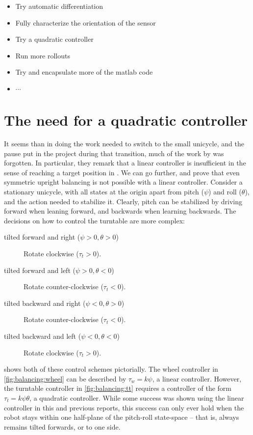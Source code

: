 \documentclass[main.tex]{subfiles}
\begin{document}
	\begin{itemize}
		\item Try automatic differentiation
		\item Fully characterize the orientation of the sensor
		\item Try a quadratic controller
		\item Run more rollouts
		\item Try and encapsulate more of the matlab code
		\item $\cdots$
	\end{itemize}

	\section{The need for a quadratic controller}

	It seems than in doing the work needed to switch to the small unicycle, and the pause put in the project during that transition, much of the work by \citeauthor{queiro} was forgotten.
	In particular, they remark that a linear controller is insufficient in the sense of reaching a target position in \cite[fig.~8]{queiro}.
	We can go further, and prove that even symmetric upright balancing is not possible with a linear controller.
	Consider a stationary unicycle, with all states at the origin apart from pitch ($\psi$) and roll ($\theta$), and the action needed to stabilize it.
	Clearly, pitch can be stabilized by driving forward when leaning forward, and backwards when learning backwards.
	The decisions on how to control the turntable are more complex:
	\begin{description}
		\item[tilted forward and right ($\psi > 0, \theta > 0$)]
			Rotate clockwise ($\tau_t > 0$)\footnotemark.
		\item[tilted forward and left ($\psi > 0, \theta < 0$)]
			Rotate counter-clockwise ($\tau_t < 0$).
		\item[tilted backward and right ($\psi < 0, \theta > 0$)]
			Rotate counter-clockwise ($\tau_t < 0$).
		\item[tilted backward and left ($\psi < 0, \theta < 0$)]
			Rotate clockwise ($\tau_t > 0$).
	\end{description}
	 shows both of these control schemes pictorially.
	The wheel controller in \cref{fig:balancing:wheel} can be described by $\tau_w = k\psi$, a linear controller.
	However, the turntable controller in \cref{fig:balancing:tt} requires a controller of the form $\tau_t = k\psi\theta$, a quadratic controller.
	While some success was shown using the linear controller in this and previous reports, this success can only ever hold when the robot stays within one half-plane of the pitch-roll state-space -- that is, always remains tilted forwards, or to one side.
\end{document}
